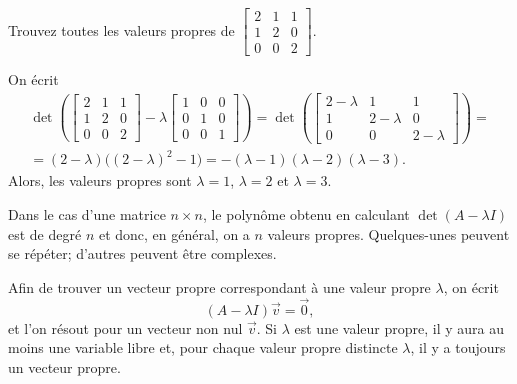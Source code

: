 \begin{example}
Trouvez toutes les valeurs propres de
$\left[ \begin{smallmatrix}
2 & 1 & 1 \\
1 & 2 & 0 \\
0 & 0 & 2
\end{smallmatrix} \right]$.

On écrit
\begin{multline*}
\det \left(
\begin{bmatrix}
2 & 1 & 1 \\
1 & 2 & 0 \\
0 & 0 & 2
\end{bmatrix}
- \lambda 
\begin{bmatrix}
1 & 0 & 0 \\
0 & 1 & 0 \\
0 & 0 & 1
\end{bmatrix}
\right)
=
\det \left(
\begin{bmatrix}
2-\lambda & 1 & 1 \\
1 & 2-\lambda & 0 \\
0 & 0 & 2-\lambda
\end{bmatrix}
\right)
= \\
=
(2-\lambda) \bigl({(2-\lambda)}^2 - 1\bigr)
= 
-(\lambda -1)(\lambda -2)(\lambda-3) .
\end{multline*}
Alors, les valeurs propres sont $\lambda = 1$, $\lambda = 2$ et
$\lambda = 3$.
\end{example}

Dans le cas d’une matrice $n \times n$, le polynôme obtenu en calculant $\det(A - \lambda I)$ est de degré $n$ et donc, en général, on a $n$ valeurs propres. Quelques-unes peuvent se répéter; d’autres peuvent être complexes.

\medskip

Afin de trouver un vecteur propre correspondant à une valeur propre $\lambda$, on écrit
\begin{equation*}
(A-\lambda I) \vec{v} = \vec{0} ,
\end{equation*}
et l'on résout pour un vecteur non nul $\vec{v}$.
Si $\lambda$ est une valeur propre, il y aura au moins une variable libre et, pour chaque valeur propre distincte $\lambda$, il y a toujours un vecteur propre.

